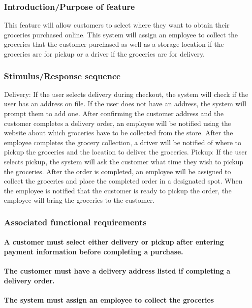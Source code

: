 \documentclass{scrreprt}
\theoremstyle{funreq}
\begin{document}
\subsubsection{Introduction/Purpose of feature}
This feature will allow customers to select where they want to obtain their groceries purchased online.  This system will assign an employee to collect the groceries that the customer purchased as well as a storage location if the groceries are for pickup or a driver if the groceries are for delivery.
\subsubsection{Stimulus/Response sequence}
Delivery: If the user selects delivery during checkout, the system will check if the user has an address on file.  If the user does not have an address, the system will prompt them to add one.  After confirming the customer address and the customer completes a delivery order, an employee will be notified using the website about which groceries have to be collected from the store.  After the employee completes the grocery collection, a driver will be notified of where to pickup the groceries and the location to deliver the groceries.
Pickup: If the user selects pickup, the system will ask the customer what time they wish to pickup the groceries.  After the order is completed, an employee will be assigned to collect the groceries and place the completed order in a designated spot.  When the employee is notified that the customer is ready to pickup the order, the employee will bring the groceries to the customer.

\subsubsection{Associated functional requirements}

\paragraph[]{\normalfont A customer must select either delivery or pickup after entering payment information before completing a purchase.}

\paragraph[]{\normalfont The customer must have a delivery address listed if completing a delivery order.}
\paragraph[]{\normalfont The system must assign an employee to collect the groceries}
\end{document}
